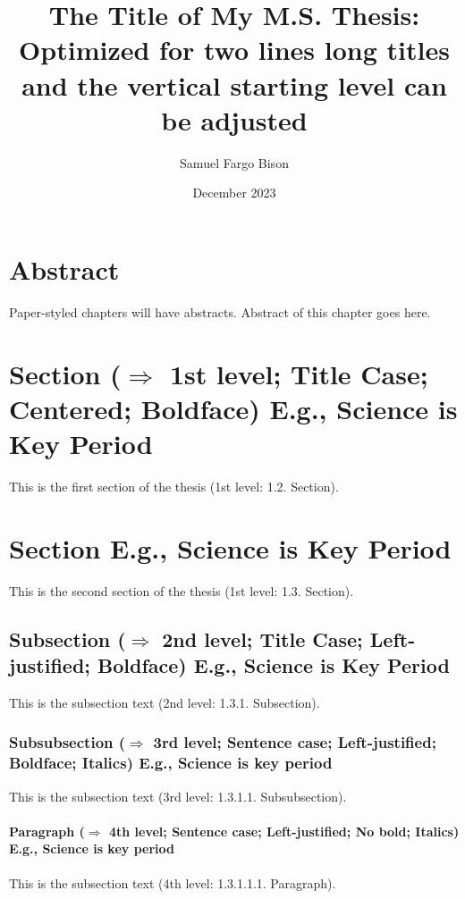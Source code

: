 \documentclass[ms-thesis,mathdesign,12pt]{ndsu-thesis-2022}
\title{The Title of My M.S. Thesis: Optimized for two lines long titles and the vertical starting level can be adjusted}
\author{Samuel Fargo Bison}
\date{December 2023}
\begin{document}


\section{Abstract}
Paper-styled chapters will have abstracts. Abstract of this chapter goes here. \kant[1]

\section{Section ($\Rightarrow$ 1st level; Title Case; Centered; Boldface) E.g., Science is Key Period}
This is the first section of the thesis (1st level: 1.2. Section). \kant[2]

\section{Section E.g., Science is Key Period}
This is the second section of the thesis (1st level: 1.3. Section). \kant[3]

\subsection{Subsection ($\Rightarrow$ 2nd level; Title Case; Left-justified; Boldface) E.g., Science is Key Period}
This is the subsection text (2nd level: 1.3.1. Subsection). \kant[4]

\subsubsection{Subsubsection ($\Rightarrow$ 3rd level; Sentence case; Left-justified; Boldface; Italics) E.g., Science is key period}
This is the subsection text (3rd level: 1.3.1.1. Subsubsection). \kant[5]

\paragraph{Paragraph ($\Rightarrow$ 4th level; Sentence case; Left-justified; No bold; Italics)  E.g., Science is key period}
This is the subsection text (4th level: 1.3.1.1.1. Paragraph). \kant[6]
\end{document}
